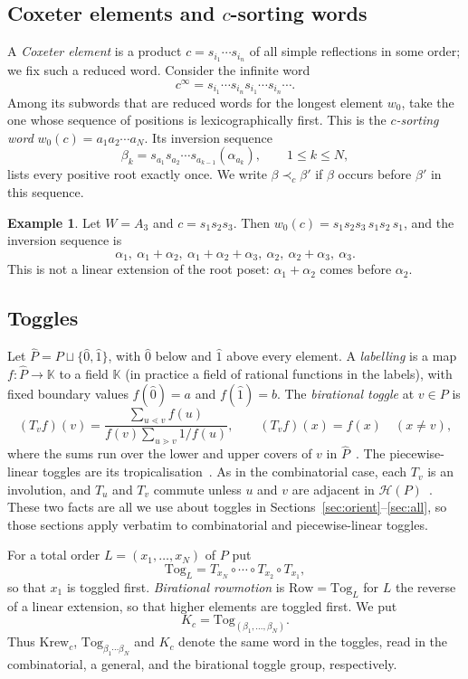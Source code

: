 \documentclass[11pt]{amsart}
\theoremstyle{definition}
\newtheorem{example}[theorem]{Example}
\newcommand{\Tog}{\mathrm{Tog}}
\newcommand{\Row}{\mathrm{Row}}
\newcommand{\pr}{\prec_c}
\newcommand{\Hasse}{\mathcal H}
\begin{document}
\subsection{\texorpdfstring{Coxeter elements and $c$-sorting words}{Coxeter elements and c-sorting words}}
A \emph{Coxeter element} is a product $c=s_{i_1}\cdots s_{i_n}$ of all simple reflections in some order; we fix such a reduced word. Consider the infinite word
\[c^\infty=s_{i_1}\cdots s_{i_n}s_{i_1}\cdots s_{i_n}\cdots.\]
Among its subwords that are reduced words for the longest element $w_0$, take the one whose sequence of positions is lexicographically first. This is the \emph{$c$-sorting word} $w_0(c)=a_1a_2\cdots a_N$. Its inversion sequence
\[\beta_k=s_{a_1}s_{a_2}\cdots s_{a_{k-1}}(\alpha_{a_k}),\qquad 1\le k\le N,\]
lists every positive root exactly once. We write $\beta\pr\beta'$ if $\beta$ occurs before $\beta'$ in this sequence.

\begin{example}\label{ex:A3}
Let $W=A_3$ and $c=s_1s_2s_3$. Then $w_0(c)=s_1s_2s_3\,s_1s_2\,s_1$, and the inversion sequence is
\[\alpha_1,\ \alpha_1+\alpha_2,\ \alpha_1+\alpha_2+\alpha_3,\ \alpha_2,\ \alpha_2+\alpha_3,\ \alpha_3 .\]
This is not a linear extension of the root poset: $\alpha_1+\alpha_2$ comes before $\alpha_2$.
\end{example}

\subsection{Toggles}
Let $\widehat P=P\sqcup\{\hat0,\hat1\}$, with $\hat0$ below and $\hat1$ above every element. A \emph{labelling} is a map $f:\widehat P\to\mathbb K$ to a field $\mathbb K$ (in practice a field of rational functions in the labels), with fixed boundary values $f(\hat0)=a$ and $f(\hat1)=b$. The \emph{birational toggle} at $v\in P$ is
\[(T_vf)(v)=\frac{\sum_{u\lessdot v}f(u)}{f(v)\sum_{u\gtrdot v}1/f(u)},\qquad (T_vf)(x)=f(x)\quad(x\neq v),\]
where the sums run over the lower and upper covers of $v$ in $\widehat P$~\cite{EP,GR1}. The piecewise-linear toggles are its tropicalisation~\cite{EP}. As in the combinatorial case, each $T_v$ is an involution, and $T_u$ and $T_v$ commute unless $u$ and $v$ are adjacent in $\Hasse(P)$~\cite[\S2]{GR1}. These two facts are all we use about toggles in Sections~\ref{sec:orient}--\ref{sec:all}, so those sections apply verbatim to combinatorial and piecewise-linear toggles.

For a total order $L=(x_1,\dots,x_N)$ of $P$ put
\[\Tog_L=T_{x_N}\circ\cdots\circ T_{x_2}\circ T_{x_1},\]
so that $x_1$ is toggled first. \emph{Birational rowmotion} is $\Row=\Tog_L$ for $L$ the reverse of a linear extension, so that higher elements are toggled first. We put
\[K_c=\Tog_{(\beta_1,\dots,\beta_N)}.\]
Thus $\mathrm{Krew}_c$, $\Tog_{\beta_1\cdots\beta_N}$ and $K_c$ denote the same word in the toggles, read in the combinatorial, a general, and the birational toggle group, respectively.
\end{document}
